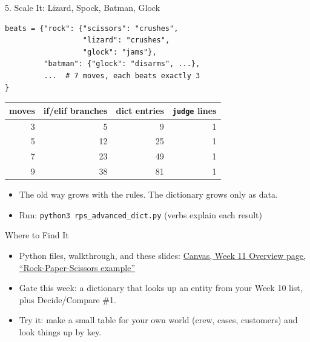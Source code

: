\documentclass{beamer}
\begin{document}
\begin{frame}[fragile]{5. Scale It: Lizard, Spock, Batman, Glock}
\begin{verbatim}
beats = {"rock": {"scissors": "crushes",
                  "lizard": "crushes",
                  "glock": "jams"},
         "batman": {"glock": "disarms", ...},
         ...  # 7 moves, each beats exactly 3
}
\end{verbatim}
\begin{center}\small
\begin{tabular}{r|r|r|r}
moves & if/elif branches & dict entries & \texttt{judge} lines\\\hline
3 & 5 & 9 & 1\\
5 & 12 & 25 & 1\\
7 & 23 & 49 & 1\\
9 & 38 & 81 & 1\\
\end{tabular}
\end{center}
\begin{itemize}
    \item The old way grows with the rules. The dictionary grows only as data.
    \item Run: \texttt{python3 rps\_advanced\_dict.py} (verbs explain each result)
\end{itemize}
\end{frame}

\begin{frame}{Where to Find It}
\begin{itemize}
    \item Python files, walkthrough, and these slides: \href{https://swosu.instructure.com/courses/74029/pages/week-11-overview-lists-and-dictionaries-continued}{Canvas, Week 11 Overview page, ``Rock-Paper-Scissors example''}
    \item Gate this week: a dictionary that looks up an entity from your Week 10 list, plus Decide/Compare \#1.
    \item Try it: make a small table for your own world (crew, cases, customers) and look things up by key.
\end{itemize}
\end{frame}
\end{document}
